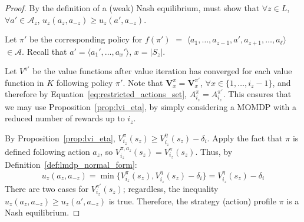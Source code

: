 \begin{proof}
By the definition of a (weak) Nash equilibrium, must show that $\forall z \in L$, $\forall a' \in \mathcal{A}_z$, $u_z(a_z, a_{-z}) \geq u_z(a', a_{-z})$.

Let $\pi'$ be the corresponding policy for $f(\pi')$ $=$ $\langle a_1, \ldots, a_{z-1}, a', a_{z+1}, \ldots, a_\ell \rangle$ $\in \mathcal{A}$. Recall that $a' = \langle a_1', \ldots, a_x' \rangle$, $x = |S_z|$.

Let $V^{\pi'}$ be the value functions after value iteration has converged for each value function in $K$ following policy $\pi'$. Note that $\mathbf{V}_x^\pi = \mathbf{V}_x^{\pi'}$, $\forall x \in \{1, \ldots, i_z - 1\}$, and therefore by Equation~\ref{eq:restricted_actions_set}, $A_{i_z}^\pi = A_{i_z}^{\pi'}$. This ensures that we may use Proposition~\ref{prop:lvi_eta}, by simply considering a MOMDP with a reduced number of rewards up to $i_z$.

By Proposition~\ref{prop:lvi_eta}, $V_{i_z}^\pi (s_z) \geq V_{i_z}^\eta (s_z) - \delta_i$. Apply the fact that $\pi$ is defined following action $a_z$, so $V_{i_z}^{\pi, a_z} (s_z) = V_{i_z}^\pi (s_z)$. Thus, by Definition~\ref{def:lmdp_normal_form}:
\begin{equation*}
    u_z(a_z, a_{-z}) = \min \{ V_{i_z}^\pi (s_z), V_{i_z}^\eta (s_z) - \delta_i \} = V_{i_z}^\eta (s_z) - \delta_i
\end{equation*}
There are two cases for $V_{i_z}^{\pi'} (s_z)$; regardless, the inequality $u_z(a_z, a_{-z}) \geq u_z(a', a_{-z})$ is true. Therefore, the strategy (action) profile $\pi$ is a Nash equilibrium.

%


\end{proof}

